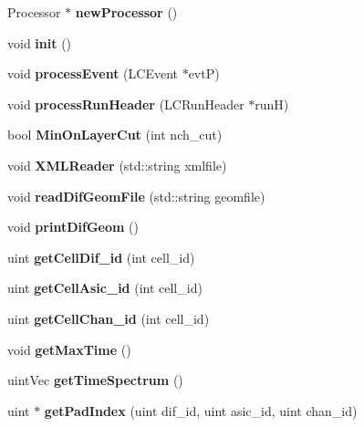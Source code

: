 \begin{DoxyCompactItemize}
\item 
Processor $\ast$ {\bfseries new\-Processor} ()\label{classTriventProc_a2eed3578f54694abc42fa4307dee1d20}

\item 
void {\bfseries init} ()\label{classTriventProc_ae13d0d62abd79b6836fe8eb897ee64c2}

\item 
void {\bf process\-Event} (L\-C\-Event $\ast$evt\-P)
\item 
void {\bfseries process\-Run\-Header} (L\-C\-Run\-Header $\ast$run\-H)\label{classTriventProc_a2a2ab0532cce0a212604ee07b777042d}

\item 
bool {\bfseries Min\-On\-Layer\-Cut} (int nch\-\_\-cut)\label{classTriventProc_ad0bda688a420336ce0b8eb2a1aae1534}

\item 
void {\bfseries X\-M\-L\-Reader} (std\-::string xmlfile)\label{classTriventProc_abbb736b698e72d3df8f7f3a30f280c78}

\item 
void {\bfseries read\-Dif\-Geom\-File} (std\-::string geomfile)\label{classTriventProc_a0b10dd2335c26feeefbc3f0dfd0de6c3}

\item 
void {\bfseries print\-Dif\-Geom} ()\label{classTriventProc_af2fc3368fa8ff09d0e6472fd6e0ca4a2}

\item 
uint {\bfseries get\-Cell\-Dif\-\_\-id} (int cell\-\_\-id)\label{classTriventProc_acf38b8e2ac310cdf8012089acf12dda2}

\item 
uint {\bfseries get\-Cell\-Asic\-\_\-id} (int cell\-\_\-id)\label{classTriventProc_a1fab13fc22554bfcee80d2bbc6e77510}

\item 
uint {\bfseries get\-Cell\-Chan\-\_\-id} (int cell\-\_\-id)\label{classTriventProc_af5fd540819042b9426b6c2c7485fb572}

\item 
void {\bfseries get\-Max\-Time} ()\label{classTriventProc_a42cd3e93ef2b88ead1bd2395945ea5e3}

\item 
uint\-Vec {\bfseries get\-Time\-Spectrum} ()\label{classTriventProc_a8d0b6dc0fad10f71100f617b1c970f48}

\item 
uint $\ast$ {\bfseries get\-Pad\-Index} (uint dif\-\_\-id, uint asic\-\_\-id, uint chan\-\_\-id)\label{classTriventProc_a5c8cc7cacb9b8bce67a4ca63e27afa53}


\end{DoxyCompactItemize}
